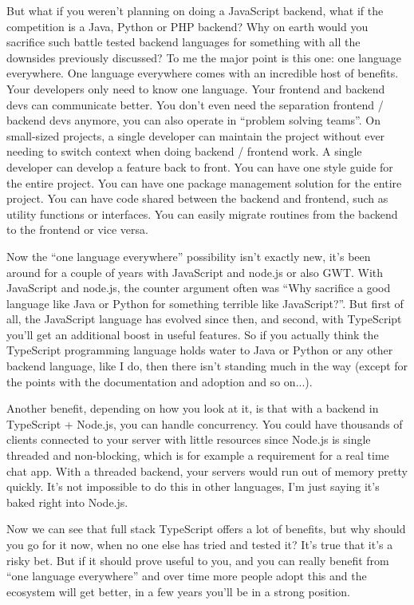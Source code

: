\documentclass[12pt,a4paper]{report}
\begin{document}
But what if you weren't planning on doing a JavaScript backend, what if the competition is a Java, Python or PHP backend? Why on earth would you sacrifice such battle tested backend languages for something with all the downsides previously discussed? To me the major point is this one: one language everywhere. One language everywhere comes with an incredible host of benefits. Your developers only need to know one language. Your frontend and backend devs can communicate better. You don't even need the separation frontend / backend devs anymore, you can also operate in ``problem solving teams''. On small-sized projects, a single developer can maintain the project without ever needing to switch context when doing backend / frontend work. A single developer can develop a feature back to front. You can have one style guide for the entire project. You can have one package management solution for the entire project. You can have code shared between the backend and frontend, such as utility functions or interfaces. You can easily migrate routines from the backend to the frontend or vice versa.

Now the ``one language everywhere'' possibility isn't exactly new, it's been around for a couple of years with JavaScript and node.js or also GWT. With JavaScript and node.js, the counter argument often was ``Why sacrifice a good language like Java or Python for something terrible like JavaScript?''. But first of all, the JavaScript language has evolved since then, and second, with TypeScript you'll get an additional boost in useful features. So if you actually think the TypeScript programming language holds water to Java or Python or any other backend language, like I do, then there isn't standing much in the way (except for the points with the documentation and adoption and so on...).

Another benefit, depending on how you look at it, is that with a backend in TypeScript + Node.js, you can handle concurrency. You could have thousands of clients connected to your server with little resources since Node.js is single threaded and non-blocking, which is for example a requirement for a real time chat app. With a threaded backend, your servers would run out of memory pretty quickly. It's not impossible to do this in other languages, I'm just saying it's baked right into Node.js.

Now we can see that full stack TypeScript offers a lot of benefits, but why should you go for it now, when no one else has tried and tested it? It's true that it's a risky bet. But if it should prove useful to you, and you can really benefit from ``one language everywhere'' and over time more people adopt this and the ecosystem will get better, in a few years you'll be in a strong position.
\end{document}
